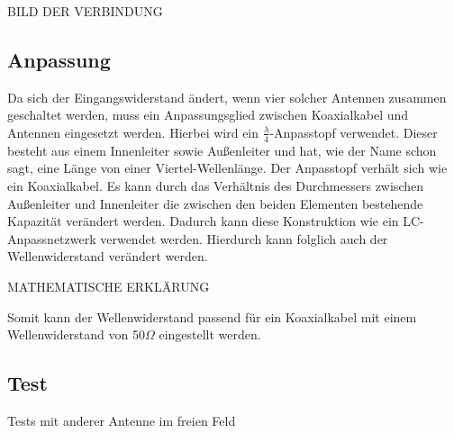 BILD DER VERBINDUNG

\subsection{Anpassung}
Da sich der Eingangswiderstand ändert, wenn vier solcher Antennen zusammen geschaltet werden, muss ein Anpassungsglied zwischen Koaxialkabel und Antennen eingesetzt werden. Hierbei wird ein $\frac{\lambda}{4}$-Anpasstopf verwendet. Dieser besteht aus einem Innenleiter sowie Außenleiter und hat, wie der Name schon sagt, eine Länge von einer Viertel-Wellenlänge. Der Anpasstopf verhält sich wie ein Koaxialkabel. Es kann durch das Verhältnis des Durchmessers zwischen Außenleiter und Innenleiter die zwischen den beiden Elementen bestehende Kapazität verändert werden. Dadurch kann diese Konstruktion wie ein LC-Anpassnetzwerk verwendet werden. Hierdurch kann folglich auch der Wellenwiderstand verändert werden. 

MATHEMATISCHE ERKLÄRUNG

Somit kann der Wellenwiderstand passend für ein Koaxialkabel mit einem Wellenwiderstand von 50$\Omega$ eingestellt werden.

\subsection{Test}

Tests mit anderer Antenne im freien Feld